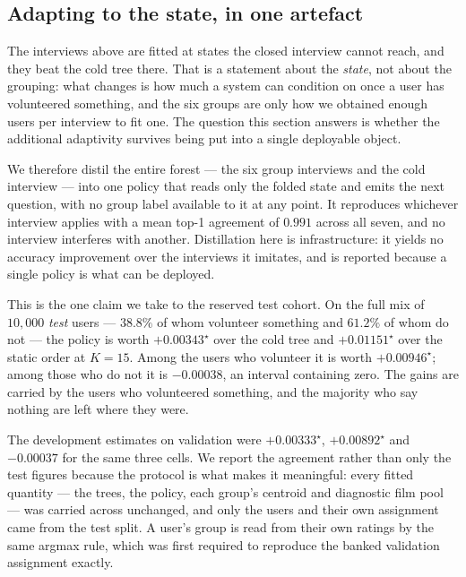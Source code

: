 \documentclass[11pt]{article}
\begin{document}
\subsection{Adapting to the state, in one artefact}
\label{sec:onepolicy}

The interviews above are fitted at states the closed interview cannot reach, and they beat the cold
tree there. That is a statement about the \emph{state}, not about the grouping: what changes is how
much a system can condition on once a user has volunteered something, and the six groups are only how
we obtained enough users per interview to fit one. The question this section answers is whether the
additional adaptivity survives being put into a single deployable object.

We therefore distil the entire forest --- the six group interviews and the cold interview --- into one
policy that reads only the folded state and emits the next question, with no group label available to
it at any point. It reproduces whichever interview applies with a mean top-1 agreement of $0.991$
across all seven, and no interview interferes with another. Distillation here is infrastructure: it
yields no accuracy improvement over the interviews it imitates, and is reported because a single
policy is what can be deployed.

This is the one claim we take to the reserved test cohort. On the full mix of $10{,}000$ \emph{test}
users --- $38.8\%$ of whom volunteer something and $61.2\%$ of whom do not --- the policy is worth
$\mathbf{+0.00343^\star}$ over the cold tree and $+0.01151^\star$ over the static order at $K{=}15$.
Among the users who volunteer it is worth $+0.00946^\star$; among those who do not it is $-0.00038$,
an interval containing zero. The gains are carried by the users who volunteered something, and the
majority who say nothing are left where they were.

The development estimates on validation were $+0.00333^\star$, $+0.00892^\star$ and $-0.00037$ for
the same three cells. We report the agreement rather than only the test figures because the
protocol is what makes it meaningful: every fitted quantity --- the trees, the policy, each group's
centroid and diagnostic film pool --- was carried across unchanged, and only the users and their own
assignment came from the test split. A user's group is read from their own ratings by the same
argmax rule, which was first required to reproduce the banked validation assignment exactly.
\end{document}
